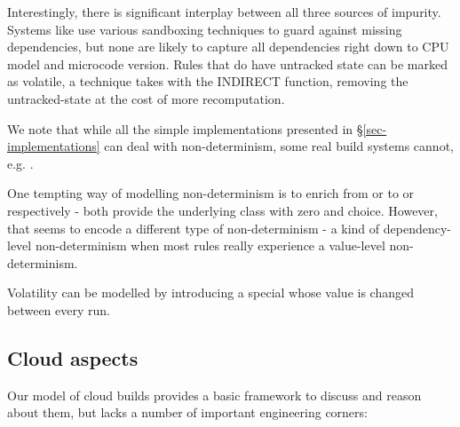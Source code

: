 Interestingly, there is significant interplay between all three sources of impurity. Systems like \Bazel use various sandboxing techniques to guard against missing dependencies, but none are likely to capture all dependencies right down to CPU model and microcode version. Rules that do have untracked state can be marked as volatile, a technique \Excel takes with the \textsf{INDIRECT} function, removing the untracked-state at the cost of more recomputation.

We note that while all the simple implementations presented in \S\ref{sec-implementations} can deal with non-determinism, some real build systems cannot, e.g. \Buck.

One tempting way of modelling non-determinism is to enrich  from  or  to  or  respectively - both provide the underlying class with zero and choice. However, that seems to encode a different type of non-determinism - a kind of dependency-level non-determinism when most rules really experience a value-level non-determinism.

Volatility can be modelled by introducing a special  whose value is changed between every run.

\subsection{Cloud aspects}\label{sec-cloud-aspects}

Our model of cloud builds provides a basic framework to discuss and reason about them, but lacks a number of important engineering corners:

